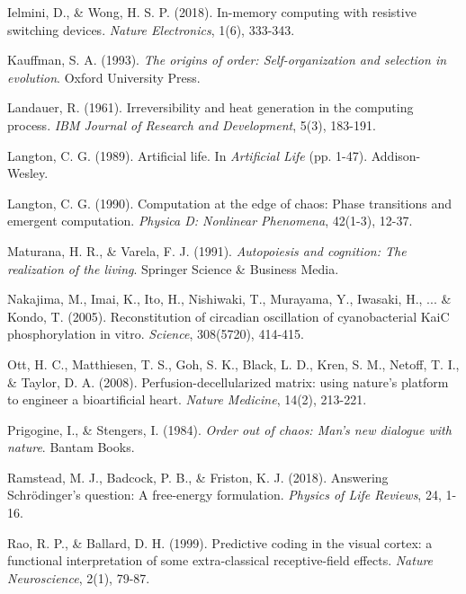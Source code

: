 \documentclass[11pt]{article}
\begin{document}
\begin{thebibliography}{99}
Ielmini, D., \& Wong, H. S. P. (2018).
\newblock In-memory computing with resistive switching devices.
\newblock \textit{Nature Electronics}, 1(6), 333-343.

Kauffman, S. A. (1993).
\newblock \textit{The origins of order: Self-organization and selection in evolution}.
\newblock Oxford University Press.

Landauer, R. (1961).
\newblock Irreversibility and heat generation in the computing process.
\newblock \textit{IBM Journal of Research and Development}, 5(3), 183-191.

Langton, C. G. (1989).
\newblock Artificial life.
\newblock In \textit{Artificial Life} (pp. 1-47). Addison-Wesley.

Langton, C. G. (1990).
\newblock Computation at the edge of chaos: Phase transitions and emergent computation.
\newblock \textit{Physica D: Nonlinear Phenomena}, 42(1-3), 12-37.

Maturana, H. R., \& Varela, F. J. (1991).
\newblock \textit{Autopoiesis and cognition: The realization of the living}.
\newblock Springer Science \& Business Media.

Nakajima, M., Imai, K., Ito, H., Nishiwaki, T., Murayama, Y., Iwasaki, H., ... \& Kondo, T. (2005).
\newblock Reconstitution of circadian oscillation of cyanobacterial KaiC phosphorylation in vitro.
\newblock \textit{Science}, 308(5720), 414-415.

Ott, H. C., Matthiesen, T. S., Goh, S. K., Black, L. D., Kren, S. M., Netoff, T. I., \& Taylor, D. A. (2008).
\newblock Perfusion-decellularized matrix: using nature's platform to engineer a bioartificial heart.
\newblock \textit{Nature Medicine}, 14(2), 213-221.

Prigogine, I., \& Stengers, I. (1984).
\newblock \textit{Order out of chaos: Man's new dialogue with nature}.
\newblock Bantam Books.

Ramstead, M. J., Badcock, P. B., \& Friston, K. J. (2018).
\newblock Answering Schrödinger's question: A free-energy formulation.
\newblock \textit{Physics of Life Reviews}, 24, 1-16.

Rao, R. P., \& Ballard, D. H. (1999).
\newblock Predictive coding in the visual cortex: a functional interpretation of some extra-classical receptive-field effects.
\newblock \textit{Nature Neuroscience}, 2(1), 79-87.


\end{thebibliography}
\end{document}
